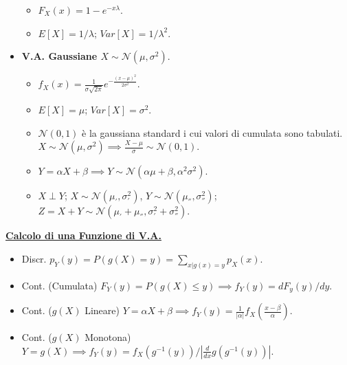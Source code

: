 \documentclass{article}
\begin{document}
\begin{multicols*}{3}
\begin{itemize}
\begin{itemize}
        \item $F_{X}(x)=1-e^{-x\lambda}$.
        \item $E[X]=1/\lambda$; $Var[X]=1/\lambda^{2}$.
    \end{itemize}
    \item \textbf{V.A. Gaussiane $X\sim\mathcal{N}(\mu,\sigma^{2})$}.
    \begin{itemize}
        \item $f_{X}(x)=\frac{1}{\sigma\sqrt{2\pi}}e^{-\frac{(x-\mu)^{2}}{2\sigma^{2}}}$.
        \item $E[X]=\mu$; $Var[X]=\sigma^{2}$.
        \item $\mathcal{N}(0,1)$ è la gaussiana standard i cui valori di cumulata sono tabulati. $X\sim\mathcal{N}(\mu, \sigma^{2})\implies \frac{X-\mu}{\sigma}\sim\mathcal{N}(0,1)$.
        \item $Y=\alpha X+\beta\implies Y\sim\mathcal{N}(\alpha\mu +\beta,\alpha^{2}\sigma^{2})$.
        \item $X\perp Y$; $X\sim\mathcal{N}(\mu_{'}, \sigma_{'}^{2})$, $Y\sim\mathcal{N}(\mu_{''}, \sigma_{''}^{2})$; $Z=X+Y\sim\mathcal{N}(\mu_{'}+\mu_{''}, \sigma_{'}^{2}+\sigma_{''}^{2})$.
    \end{itemize}
\end{itemize}
\textbf{\underline{Calcolo di una Funzione di V.A.}}
\begin{itemize}
    \item Discr. $p_{Y}(y)=P(g(X)=y)=\sum_{x|g(x)=y}p_{X}(x)$.
    \item Cont. (Cumulata) $F_{Y}(y)=P(g(X)\leq y)\implies f_{Y}(y)=dF_{y}(y)/dy$.
    \item Cont. ($g(X)$ Lineare) $Y=\alpha X+\beta\implies f_{Y}(y)=\frac{1}{|\alpha|}f_{X}(\frac{x-\beta}{\alpha})$.
    \item Cont. ($g(X)$ Monotona) $Y=g(X)\implies f_{Y}(y)=f_{X}(g^{-1}(y))/\left|\frac{d}{dx}g(g^{-1}(y))\right|$.
\end{itemize}

\end{multicols*}
\end{document}
